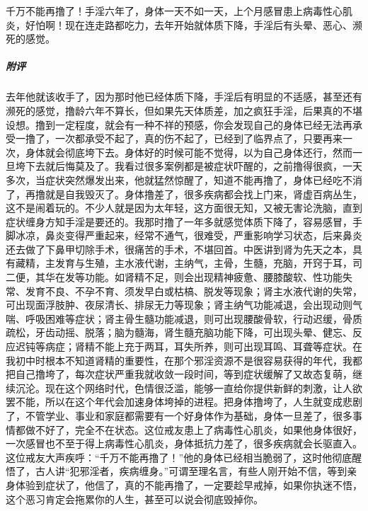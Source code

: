 \begin{case}
    千万不能再撸了！手淫六年了，身体一天不如一天，上个月感冒患上病毒性心肌炎，好怕啊！现在连走路都吃力，去年开始就体质下降，手淫后有头晕、恶心、濒死的感觉。
    \subparagraph{附评} 去年他就该收手了，因为那时他已经体质下降，手淫后有明显的不适感，甚至还有濒死的感觉，撸龄六年不算长，但如果先天体质差，加之疯狂手淫，后果真的不堪设想。撸到一定程度，就会有一种不祥的预感，你会发现自己的身体已经无法再承受一撸了，一次都承受不起了，真的伤不起了，已经到了临界点了，只要再来一次，身体就会彻底垮下去。身体好的时候可能不觉得，以为自己身体还行，然而一旦垮下去就后悔莫及了。我看过很多案例都是被症状吓醒的，之前撸得很疯，一天多次，当症状突然爆发出来，他就猛然惊醒了，知道不能再撸了，身体已经吃不消了，再撸就是自我毁灭了。身体撸差了，很多疾病都会找上门来，肾虚百病丛生，这不是闹着玩的。不少人就是因为太年轻，这方面很无知，又被无害论洗脑，直到症状缠身方知手淫是要还的。我那时撸了一年多就感觉体质下降了，容易感冒，手脚冰凉，鼻炎变得严重起来，经常不通气，很难受，严重影响学习状态，后来鼻炎还去做了下鼻甲切除手术，很痛苦的手术，不堪回首。中医讲到肾为先天之本，具有藏精，主发育与生殖，主水液代谢，主纳气，主骨，生髓，充脑，开窍于耳，司二便，其华在发等功能。如肾精不足，则会出现精神疲惫、腰膝酸软、性功能失常、发育不良、不孕不育、须发早白或枯槁、脱发等现象；肾主水液代谢的失常，可出现面浮肢肿、夜尿清长、排尿无力等现象；肾主纳气功能减退，会出现动则气喘、呼吸困难等症状；肾主骨生髓功能减退，则可出现腰酸骨软，行动迟缓，骨质疏松，牙齿动摇、脱落；脑为髓海，肾生髓充脑功能下降，可出现头晕、健忘、反应迟钝等病症；肾精不能上充于两耳，耳失所养，则可出现耳鸣、耳聋等症状。在我初中时根本不知道肾精的重要性，在那个邪淫资源不是很容易获得的年代，我都把自己撸垮了，每次症状严重我就收敛一段时间，等到症状缓解了又故态复萌，继续沉沦。现在这个网络时代，色情很泛滥，能够一直给你提供新鲜的刺激，让人欲罢不能，所以在这个年代会加速身体垮掉的进程。把身体撸垮了，人生就变成悲剧了，不管学业、事业和家庭都需要有一个好身体作为基础，身体一旦差了，很多事情都做不好了，完全不在状态。这位戒友患上了病毒性心肌炎，如果他身体很好，一次感冒也不至于得上病毒性心肌炎，身体抵抗力差了，很多疾病就会长驱直入。这位戒友大声疾呼：“千万不能再撸了！”他的身体已经相当脆弱了，这时他彻底醒悟了，古人讲“犯邪淫者，疾病缠身。”可谓至理名言，有些人刚开始不信，等到亲身体验到症状了，他信了，真的不能再撸了，一定要趁早戒掉，如果你执迷不悟，这个恶习肯定会拖累你的人生，甚至可以说会彻底毁掉你。
\end{case}

